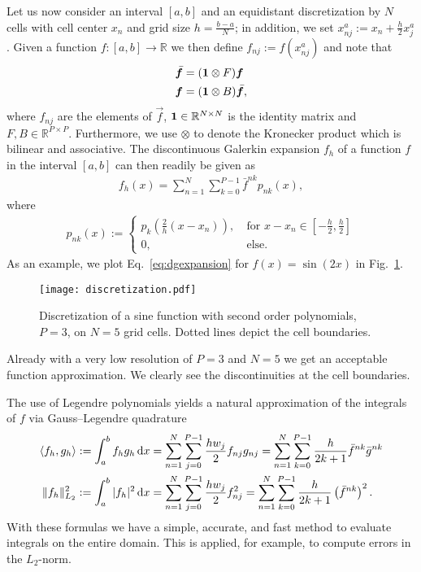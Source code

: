Let us now consider an interval $[a,b]$ and an equidistant discretization
by $N$ cells with cell center $x_n$ and grid size $h=\frac{b-a}{N}$; in addition, we set $x_{nj}^a := x_n + \frac{h}{2}x^a_j$.
Given a function $f:[a,b]\rightarrow \mathbb{R}$ we then define
$f_{nj} := f(x^a_{nj})$ and note that
\begin{subequations}
\begin{align}
    \bar{ {\boldsymbol{f}}} &= (\mathbf{1}\otimes F) {\boldsymbol{f}} \\
    {\boldsymbol{f}} &= (\mathbf{1}\otimes B) \bar{{\boldsymbol{f}}},
    \label{}
\end{align}
\end{subequations}
where $f_{nj}$ are the elements of $\vec f$,
 $\mathbf{1}\in\mathbb{R}^{N\times N}$ is the identity matrix and $F,B\in\mathbb{R}^{P\times P}$. Furthermore, we use
$\otimes$ to denote the Kronecker product which is bilinear and associative.
The discontinuous Galerkin expansion $f_h$ of a function $f$ in the interval $[a,b]$ can
then readily be given as
\begin{align}
    f_h(x) = \sum_{n=1}^N \sum_{k=0}^{P-1} \bar f^{nk} p_{nk}(x),
    \label{eq:dgexpansion}
\end{align}
where
\begin{align}
    p_{nk}(x) := \begin{cases}
        p_k\left(  \frac{2}{h}(x-x_n)\right),& \ \text{for } x-x_n\in\left[ -\frac{h}{2}, \frac{h}{2} \right]\\
        0,& \ \text{else}.
    \end{cases}
    \label{}
\end{align}
As an example, we plot Eq.~\eqref{eq:dgexpansion} for $f(x)=\sin(2x)$ in Fig.~\ref{fig:discretization}.
\begin{figure}[htpb]
    \texttt{[image: discretization.pdf]}
    \caption{ 
    Discretization of a sine function with second order polynomials, $P=3$, 
    on $N=5$ grid cells. Dotted lines depict the cell boundaries. 
    }
    \label{fig:discretization}
\end{figure}
Already with a very low resolution of $P=3$ and $N=5$
we get an acceptable function approximation. We clearly see the discontinuities
at the cell boundaries.

The use of Legendre polynomials yields a natural approximation of the integrals of $f$
via Gauss--Legendre quadrature
\begin{subequations}
\begin{align}
    \langle f_h,g_h\rangle:=\int_a^b f_hg_h \,\mathrm{d}x &= \sum_{n=1}^N\sum_{j=0}^{P-1} \frac{hw_j}{2} f_{nj} g_{nj} 
    = \sum_{n=1}^N\sum_{k=0}^{P-1}\frac{h}{2k+1}\bar f^{nk}\bar g^{nk}  \\
    \|f_h\|^2_{L_2} := \int_a^b |f_h|^2 \,\mathrm{d}x &= \sum_{n=1}^N\sum_{j=0}^{P-1} \frac{h w_j}{2}f_{nj}^2 
    = \sum_{n=1}^N\sum_{k=0}^{P-1} \frac{h}{2k+1}\left(\bar f^{nk}\right)^2. 
    \label{eq:def_norm}
\end{align}
\label{eq:gausslegendre}
\end{subequations}
With these formulas we have a simple, accurate, and fast
method to evaluate integrals on the entire domain. This is applied, for example, to compute
errors in the $L_2$-norm.

